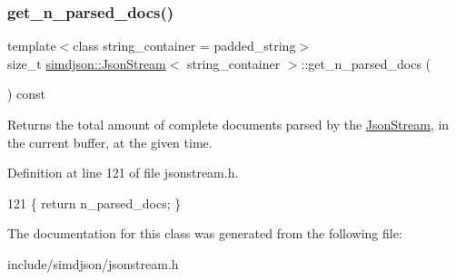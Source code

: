 \subsubsection{\texorpdfstring{get\+\_\+n\+\_\+parsed\+\_\+docs()}{get\_n\_parsed\_docs()}}
{\footnotesize\ttfamily template$<$class string\+\_\+container  = padded\+\_\+string$>$ \\
size\+\_\+t \hyperlink{classsimdjson_1_1_json_stream}{simdjson\+::\+Json\+Stream}$<$ string\+\_\+container $>$\+::get\+\_\+n\+\_\+parsed\+\_\+docs (\begin{DoxyParamCaption}{ }\end{DoxyParamCaption}) const\hspace{0.3cm}{\ttfamily [inline]}}



Returns the total amount of complete documents parsed by the \hyperlink{classsimdjson_1_1_json_stream}{Json\+Stream}, in the current buffer, at the given time. 



Definition at line 121 of file jsonstream.\+h.


\begin{DoxyCode}
121 \{ \textcolor{keywordflow}{return} n\_parsed\_docs; \}
\end{DoxyCode}


The documentation for this class was generated from the following file\+:\begin{DoxyCompactItemize}
\item 
include/simdjson/jsonstream.\+h\end{DoxyCompactItemize}
